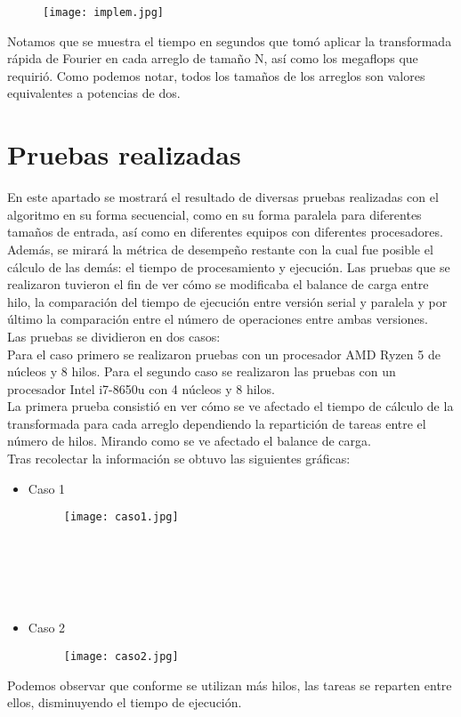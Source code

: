 \documentclass{article}
\begin{document}
\begin{figure}[h]
\centering
\texttt{[image: implem.jpg]}
\end{figure}

Notamos que se muestra el tiempo en segundos que tomó aplicar la transformada rápida de Fourier en cada arreglo de tamaño N, así como los megaflops que requirió. Como podemos notar, todos los tamaños de los arreglos son valores equivalentes a potencias de dos.
\section{Pruebas realizadas}
En este apartado se mostrará el resultado de diversas pruebas realizadas con el algoritmo en su forma secuencial, como en su forma paralela para diferentes tamaños de entrada, así como en diferentes equipos con diferentes procesadores. Además, se mirará la métrica de desempeño restante con la cual fue posible el cálculo de las demás: el tiempo de procesamiento y ejecución. 
Las pruebas que se realizaron tuvieron el fin de ver cómo se modificaba el balance de carga entre hilo, la comparación del tiempo de ejecución entre versión serial y paralela y por último la comparación entre el número de operaciones entre ambas versiones.\\

Las pruebas se dividieron en dos casos:\\

Para el caso primero se realizaron pruebas con un procesador AMD Ryzen 5 de núcleos y 8 hilos. Para el segundo caso se realizaron las pruebas con un procesador Intel i7-8650u con 4 núcleos y 8 hilos.\\

 La primera prueba consistió en ver cómo se ve afectado el tiempo de cálculo de la transformada para cada arreglo dependiendo la repartición de tareas entre el número de hilos. Mirando como se ve afectado el balance de carga.\\
Tras recolectar la información se obtuvo las siguientes gráficas:
\vspace{5cm}
\begin{itemize}
    \item Caso 1
    \begin{figure}[h]
        \centering
        \texttt{[image: caso1.jpg]}
        \end{figure}
        \\ \\
        \\ \\
     
    \item Caso 2
        \begin{figure}[h]
        \centering  
        \texttt{[image: caso2.jpg]}
\end{figure}
\end{itemize}
Podemos observar que conforme se utilizan más hilos, las tareas se reparten entre ellos, disminuyendo el tiempo de ejecución.\\
\end{document}
